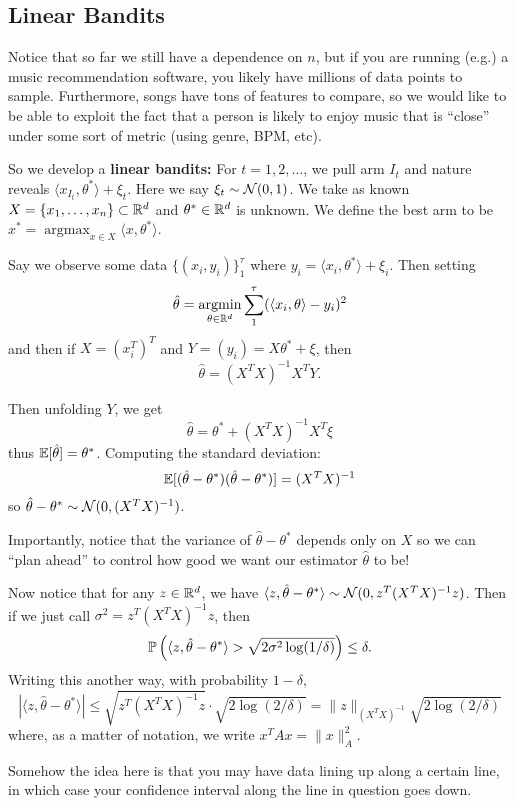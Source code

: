 \documentclass[12pt]{article}
\DeclareMathOperator*{\argmin}{argmin}
\DeclareMathOperator*{\argmax}{argmax}
\begin{document}
\subsection{Linear Bandits}
Notice that so far we still have a dependence on $n$, but if you are running (e.g.) a music recommendation software, you likely have millions of data points to sample.
Furthermore, songs have tons of features to compare, so we would like to be able to exploit the fact that a person is likely to enjoy music that is ``close'' under some sort of metric (using genre, BPM, etc).

So we develop a \textbf{linear bandits:} For $t=1,2,\dots$, we pull arm $I_t$ and nature reveals $\langle x_{I_t},\theta^\ast\rangle+\xi_t$. 
Here we say $\xi_t\sim\mathcal{N}(0,1)$. We take as known $X=\{x_1,\dots,x_n\}\subset \mathbb{R}^d$ and $\theta^\ast\in\mathbb{R}^d$ is unknown.
We define the best arm to be $x^\ast=\argmax_{x\in X}\langle x,\theta^\ast\rangle$.

Say we observe some data $\{(x_i,y_i)\}_1^\tau$ where $y_i=\langle x_i,\theta^\ast\rangle+\xi_i$. Then setting 
\[\hat\theta=\argmin_{\theta\in\bbR^d}\sum_1^\tau(\langle x_i,\theta\rangle-y_i)^2\]
and then if $X=(x_i^T)^T$ and $Y=(y_i)=X\theta^\ast+\xi$, then 
\[\hat\theta=(X^TX)^{-1}X^TY.\]

Then unfolding $Y$, we get 
\[\hat\theta=\theta^\ast+(X^TX)^{-1}X^T\xi\]
thus $\mathbb{E}[\hat\theta]=\theta^\ast$. Computing the standard deviation:
\[\mathbb{E}[(\hat\theta-\theta^\ast)(\hat\theta-\theta^\ast)]=(X^TX)^{-1}\]
so $\hat\theta-\theta^\ast\sim\mathcal{N}(0,(X^TX)^{-1})$.

Importantly, notice that the variance of $\hat\theta-\theta^\ast$ depends only on $X$ so we can ``plan ahead'' to control how good we want our estimator $\hat\theta$ to be!

Now notice that for any $z\in\mathbb{R}^d$, we have $\langle z,\hat\theta-\theta^\ast\rangle\sim\mathcal{N}(0,z^T(X^TX)^{-1}z)$. Then if we just call $\sigma^2=z^T(X^TX)^{-1}z$, then 
\[\mathbb{P}\left(\langle z,\hat\theta-\theta^\ast\rangle>\sqrt{2\sigma^2\log(1/\delta)}\right)\le\delta.\]
Writing this another way, with probability $1-\delta,$
\[|\langle z,\hat\theta-\theta^\ast\rangle|\le\sqrt{z^T(X^TX)^{-1}z}\cdot\sqrt{2\log(2/\delta)}=\|z\|_{(X^TX)^{-1}}\sqrt{2\log(2/\delta)}\]
where, as a matter of notation, we write $x^TAx=\|x\|_A^2$.

Somehow the idea here is that you may have data lining up along a certain line, in which case your confidence interval along the line in question goes down.
\end{document}
